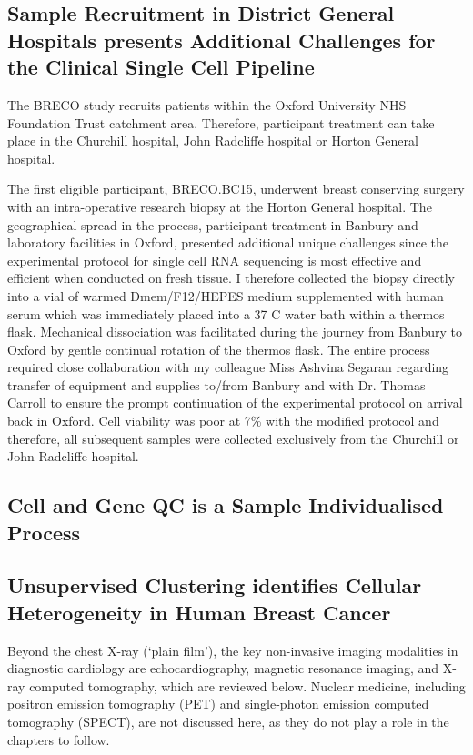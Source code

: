 \subsection{Sample Recruitment in District General Hospitals presents Additional Challenges for the Clinical Single Cell Pipeline}

The BRECO study recruits patients within the Oxford University NHS Foundation Trust catchment area. Therefore, participant treatment can take place in the Churchill hospital, John Radcliffe hospital or Horton General hospital.

The first eligible participant, BRECO.BC15, underwent breast conserving surgery with an intra-operative research biopsy at the Horton General hospital. The geographical spread in the process, participant treatment in Banbury and laboratory facilities in Oxford, presented additional unique challenges since the experimental protocol for single cell RNA sequencing is most effective and efficient when conducted on fresh tissue. I therefore collected the biopsy directly into a vial of warmed Dmem/F12/HEPES medium supplemented with human serum which was immediately placed into a 37 \textdegree{}C water bath within a thermos flask. Mechanical dissociation was facilitated during the journey from Banbury to Oxford by gentle continual rotation of the thermos flask. The entire process required close collaboration with my colleague Miss Ashvina Segaran regarding transfer of equipment and supplies to/from Banbury and with Dr. Thomas Carroll to ensure the prompt continuation of the experimental protocol on arrival back in Oxford. Cell viability was poor at 7\% with the modified protocol and therefore, all subsequent samples were collected exclusively from the Churchill or John Radcliffe hospital.

\subsection{Cell and Gene QC is a Sample Individualised Process}


\subsection{Unsupervised Clustering identifies Cellular Heterogeneity in Human Breast Cancer}
\label{sub:diagnostic}

Beyond the chest X-ray (`plain film'), the key non-invasive imaging modalities in diagnostic cardiology are echocardiography, magnetic resonance imaging, and X-ray computed tomography, which are reviewed below.  Nuclear medicine, including positron emission tomography (PET) and single-photon emission computed tomography (SPECT), are not discussed here, as they do not play a role in the chapters to follow.

